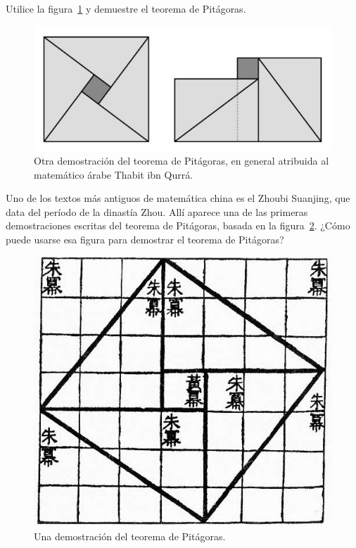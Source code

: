 \begin{exercise}
	Utilice la figura~\ref{fig:arabe} y 
	demuestre el teorema de Pitágoras.
	\begin{figure}[h]
		\centering
		\includegraphics[scale=.5]{images/pitagoras_arabe}
		\caption{Otra demostración del teorema de Pitágoras, en general
		atribuida al matemático árabe Thabit ibn Qurrá.}
		\label{fig:arabe}
	\end{figure}
\end{exercise}

\begin{exercise}
	Uno de los textos más antiguos de matemática china es el Zhoubi Suanjing,
	que data del período de la dinastía Zhou. Allí aparece una de las primeras
	demostraciones escritas del teorema de Pitágoras, basada en la
	figura~\ref{fig:China}. ¿Cómo puede usarse esa figura para demostrar el
	teorema de Pitágoras?
	\begin{figure}[h]
		\centering
		\includegraphics[scale=0.2]{images/pitagoras_china}
		\caption{Una demostración del teorema de Pitágoras.}
		\label{fig:China}
	\end{figure}
\end{exercise}

